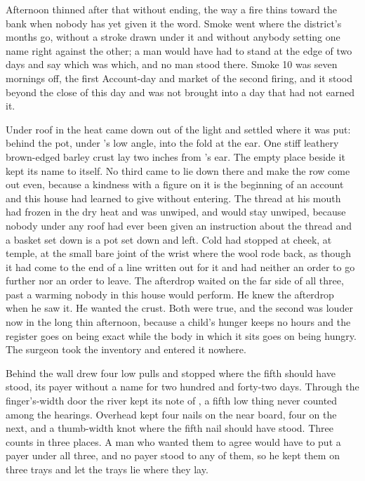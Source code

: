 Afternoon thinned after that without ending, the way a fire thins toward the bank when nobody has yet given it the word. Smoke went where the district's months go, without a stroke drawn under it and without anybody setting one name right against the other; a man would have had to stand at the edge of two days and say which was which, and no man stood there. Smoke 10 was seven mornings off, the first Account-day and market of the second firing, and it stood beyond the close of this day and was not brought into a day that had not earned it.

Under  roof in  the heat came down out of the light and settled where it was put: behind the pot, under 's low angle, into the fold at the ear. One stiff leathery brown-edged barley crust lay two inches from 's ear. The empty place beside it kept its name to itself. No third came to lie down there and make the row come out even, because a kindness with a figure on it is the beginning of an account and this house had learned to give without entering. The thread at his mouth had frozen in the dry heat and was unwiped, and would stay unwiped, because nobody under any roof had ever been given an instruction about the thread and a basket set down is a pot set down and left. Cold had stopped at cheek, at temple, at the small bare joint of the wrist where the wool rode back, as though it had come to the end of a line written out for it and had neither an order to go further nor an order to leave. The afterdrop waited on the far side of all three, past a warming nobody in this house would perform. He knew the afterdrop when he saw it. He wanted the crust. Both were true, and the second was louder now in the long thin afternoon, because a child's hunger keeps no hours and the register goes on being exact while the body in which it sits goes on being hungry. The surgeon took the inventory and entered it nowhere.

Behind the wall  drew four low pulls and stopped where the fifth should have stood, its payer without a name for two hundred and forty-two days. Through the finger's-width door the river kept its note of , a fifth low thing never counted among the hearings. Overhead  kept four nails on the near board, four on the next, and a thumb-width knot where the fifth nail should have stood. Three counts in three places. A man who wanted them to agree would have to put a payer under all three, and no payer stood to any of them, so he kept them on three trays and let the trays lie where they lay.

